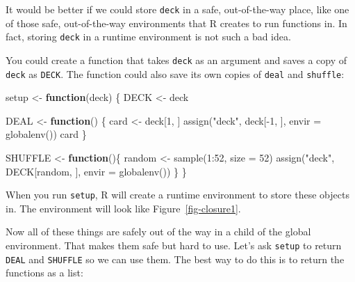 \documentclass[
  letterpaper,
  DIV=11,
  numbers=noendperiod]{scrbook}
\newenvironment{Shaded}{\begin{snugshade}}{\end{snugshade}}
\newcommand{\AttributeTok}[1]{\textcolor[rgb]{0.40,0.45,0.13}{#1}}
\newcommand{\ControlFlowTok}[1]{\textcolor[rgb]{0.00,0.23,0.31}{\textbf{#1}}}
\newcommand{\DecValTok}[1]{\textcolor[rgb]{0.68,0.00,0.00}{#1}}
\newcommand{\FunctionTok}[1]{\textcolor[rgb]{0.28,0.35,0.67}{#1}}
\newcommand{\NormalTok}[1]{\textcolor[rgb]{0.00,0.23,0.31}{#1}}
\newcommand{\OtherTok}[1]{\textcolor[rgb]{0.00,0.23,0.31}{#1}}
\newcommand{\SpecialCharTok}[1]{\textcolor[rgb]{0.37,0.37,0.37}{#1}}
\newcommand{\StringTok}[1]{\textcolor[rgb]{0.13,0.47,0.30}{#1}}
\begin{document}
It would be better if we could store \texttt{deck} in a safe,
out-of-the-way place, like one of those safe, out-of-the-way
environments that R creates to run functions in. In fact, storing
\texttt{deck} in a runtime environment is not such a bad idea.

You could create a function that takes \texttt{deck} as an argument and
saves a copy of \texttt{deck} as \texttt{DECK}. The function could also
save its own copies of \texttt{deal} and \texttt{shuffle}:

\begin{Shaded}
\begin{Highlighting}[]
\NormalTok{setup }\OtherTok{\textless{}{-}} \ControlFlowTok{function}\NormalTok{(deck) \{}
\NormalTok{  DECK }\OtherTok{\textless{}{-}}\NormalTok{ deck}

\NormalTok{  DEAL }\OtherTok{\textless{}{-}} \ControlFlowTok{function}\NormalTok{() \{}
\NormalTok{    card }\OtherTok{\textless{}{-}}\NormalTok{ deck[}\DecValTok{1}\NormalTok{, ]}
    \FunctionTok{assign}\NormalTok{(}\StringTok{"deck"}\NormalTok{, deck[}\SpecialCharTok{{-}}\DecValTok{1}\NormalTok{, ], }\AttributeTok{envir =} \FunctionTok{globalenv}\NormalTok{())}
\NormalTok{    card}
\NormalTok{  \}}

\NormalTok{  SHUFFLE }\OtherTok{\textless{}{-}} \ControlFlowTok{function}\NormalTok{()\{}
\NormalTok{    random }\OtherTok{\textless{}{-}} \FunctionTok{sample}\NormalTok{(}\DecValTok{1}\SpecialCharTok{:}\DecValTok{52}\NormalTok{, }\AttributeTok{size =} \DecValTok{52}\NormalTok{)}
    \FunctionTok{assign}\NormalTok{(}\StringTok{"deck"}\NormalTok{, DECK[random, ], }\AttributeTok{envir =} \FunctionTok{globalenv}\NormalTok{())}
\NormalTok{ \}}
\NormalTok{\}}
\end{Highlighting}
\end{Shaded}

When you run \texttt{setup}, R will create a runtime environment to
store these objects in. The environment will look like
Figure~\ref{fig-closure1}.

Now all of these things are safely out of the way in a child of the
global environment. That makes them safe but hard to use. Let's ask
\texttt{setup} to return \texttt{DEAL} and \texttt{SHUFFLE} so we can
use them. The best way to do this is to return the functions as a list:
\end{document}
